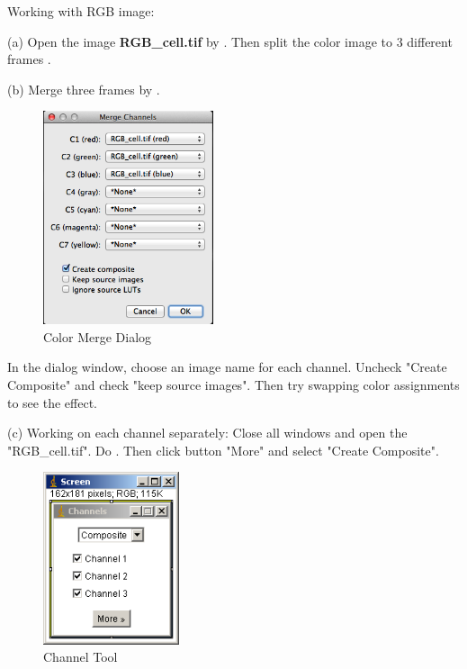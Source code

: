 \begin{indentexercise}{1}
Working with RGB image:
 
\item (a) Open the image \textbf{RGB\_cell.tif} by . Then split the color image to 3 different frames . 

\item (b) Merge three frames by . 

\begin{figure}[H]
\begin{center}
\includegraphics[width=5cm]{fig/dialog_colormerge.png}
\caption{ Color Merge Dialog}
\label{fig:img14}
\end{center}
\end{figure}

In the dialog window, choose an image name for each channel. Uncheck
"Create Composite" and check
"keep source images". Then try
swapping color assignments to see the effect. 

\item (c) Working on each channel separately: Close all windows and
open the "RGB\_cell.tif". Do
. Then click button "More" and select "Create Composite".
\begin{figure}[H]
\begin{center}
\includegraphics[width=4cm]{fig/CMCIBasicCourse201102-img15.png}
\caption{ Channel Tool}
\label{fig:img15}
\end{center}
\end{figure}


\end{indentexercise}
